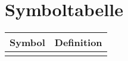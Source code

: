 \section*{Symboltabelle}
\renewcommand{\arraystretch}{1.3}
\begin{table}[H]













	\begin{tabularx}{\textwidth}{p{}p{}}
		\hline
		\textbf{Symbol} & \textbf{Definition} \\
		\hline
		\hline \\


\end{tabularx}
\end{table}
